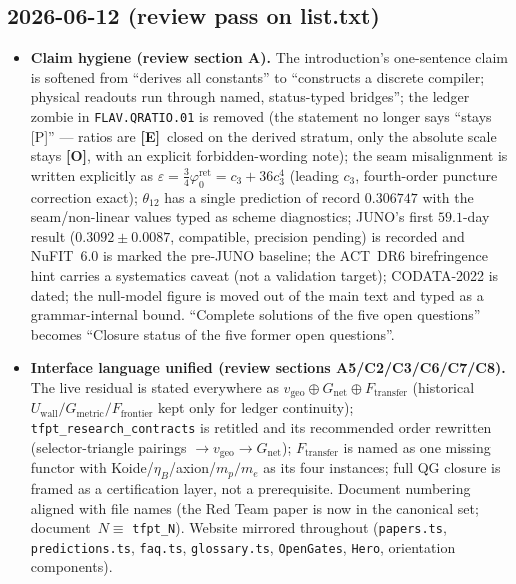 \documentclass[11pt]{article}
\providecommand{\mE}{\textbf{[E]}}\providecommand{\mC}{\textbf{[C]}}
\providecommand{\mO}{\textbf{[O]}}\providecommand{\mX}{\textbf{[X]}}
\providecommand{\cthree}{c_3}\providecommand{\phiz}{\varphi_0^{\mathrm{ret}}}
\begin{document}
\subsection*{2026-06-12 (review pass on list.txt)}
\begin{itemize}
\item \textbf{Claim hygiene (review section A).} The introduction's one-sentence claim is softened from
  ``derives all constants'' to ``constructs a discrete compiler; physical readouts run through named,
  status-typed bridges''; the ledger zombie in \texttt{FLAV.QRATIO.01} is removed (the statement no longer
  says ``stays [P]'' --- ratios are \mE\ closed on the derived stratum, only the absolute scale stays \mO,
  with an explicit forbidden-wording note); the seam misalignment is written explicitly as
  $\varepsilon=\tfrac34\phiz=\cthree+36\cthree^4$ (leading $\cthree$, fourth-order puncture correction
  exact); $\theta_{12}$ has a single prediction of record $0.306747$ with the seam/non-linear values typed
  as scheme diagnostics; JUNO's first $59.1$-day result ($0.3092\pm0.0087$, compatible, precision pending)
  is recorded and NuFIT~6.0 is marked the pre-JUNO baseline; the ACT~DR6 birefringence hint carries a
  systematics caveat (not a validation target); CODATA-2022 is dated; the null-model figure is moved out
  of the main text and typed as a grammar-internal bound. ``Complete solutions of the five open
  questions'' becomes ``Closure status of the five former open questions''.
\item \textbf{Interface language unified (review sections A5/C2/C3/C6/C7/C8).} The live residual is stated
  everywhere as $v_{\mathrm{geo}}\oplus G_{\mathrm{net}}\oplus F_{\mathrm{transfer}}$ (historical
  $U_{\mathrm{wall}}/G_{\mathrm{metric}}/F_{\mathrm{frontier}}$ kept only for ledger continuity);
  \texttt{tfpt\_research\_contracts} is retitled and its recommended order rewritten (selector-triangle
  pairings $\to v_{\mathrm{geo}}\to G_{\mathrm{net}}$); $F_{\mathrm{transfer}}$ is named as one missing
  functor with Koide/$\eta_B$/axion/$m_p/m_e$ as its four instances; full QG closure is framed as a
  certification layer, not a prerequisite. Document numbering aligned with file names (the Red Team paper
  is now in the canonical set; document~$N\equiv$ \texttt{tfpt\_N}). Website mirrored throughout
  (\texttt{papers.ts}, \texttt{predictions.ts}, \texttt{faq.ts}, \texttt{glossary.ts}, \texttt{OpenGates},
  \texttt{Hero}, orientation components).
\end{itemize}
\end{document}
